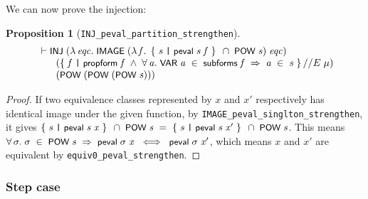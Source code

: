 \documentclass[letterpaper]{article}
\newtheorem{prop}{Proposition}
\renewcommand{\HOLConst}[1]{{\textsf{\upshape\small #1}}}
\renewcommand{\HOLinline}[1]{\ensuremath{#1}}
\newenvironment{holmath}{\begin{displaymath}\begin{array}{l}}{\end{array}\end{displaymath}\ignorespacesafterend}
\begin{document}
We can now prove the injection:
\begin{prop}[\texttt{INJ_peval_partition_strengthen}]
\begin{holmath}
  \ensuremath{\HOLTokenTurnstile}\HOLConst{INJ}\;(\HOLTokenLambda{}\HOLBoundVar{eqc}.\;\HOLConst{IMAGE}\;(\HOLTokenLambda{}\HOLBoundVar{f}.\;\HOLTokenLeftbrace{}\HOLBoundVar{s}\;\HOLTokenBar{}\;\HOLConst{peval}\;\HOLBoundVar{s}\;\HOLBoundVar{f}\HOLTokenRightbrace{}\;\HOLSymConst{\HOLTokenInter{}}\;\HOLConst{POW}\;\HOLFreeVar{s})\;\HOLBoundVar{eqc})\\
\;\;\;\;\;\;\;(\HOLTokenLeftbrace{}\HOLBoundVar{f}\;\HOLTokenBar{}\;\HOLConst{propform}\;\HOLBoundVar{f}\;\HOLSymConst{\HOLTokenConj{}}\;\HOLSymConst{\HOLTokenForall{}}\HOLBoundVar{a}.\;\HOLConst{VAR}\;\HOLBoundVar{a}\;\HOLSymConst{\HOLTokenIn{}}\;\HOLConst{subforms}\;\HOLBoundVar{f}\;\HOLSymConst{\HOLTokenImp{}}\;\HOLBoundVar{a}\;\HOLSymConst{\HOLTokenIn{}}\;\HOLFreeVar{s}\HOLTokenRightbrace{}\HOLSymConst{//E}\;\HOLFreeVar{\ensuremath{\mu}})\\
\;\;\;\;\;\;\;(\HOLConst{POW}\;(\HOLConst{POW}\;(\HOLConst{POW}\;\HOLFreeVar{s})))
\end{holmath}
\end{prop}
\begin{proof} 
If two equivalence classes represented by $x$ and $x'$ respectively has identical image under the given function, by \texttt{IMAGE_peval_singlton_strengthen}, it gives \HOLinline{\HOLTokenLeftbrace{}\HOLBoundVar{s}\;\HOLTokenBar{}\;\HOLConst{peval}\;\HOLBoundVar{s}\;\HOLFreeVar{x}\HOLTokenRightbrace{}\;\HOLSymConst{\HOLTokenInter{}}\;\HOLConst{POW}\;\HOLFreeVar{s}\;\HOLSymConst{=}\;\HOLTokenLeftbrace{}\HOLBoundVar{s}\;\HOLTokenBar{}\;\HOLConst{peval}\;\HOLBoundVar{s}\;\HOLFreeVar{x\sp{\prime}}\HOLTokenRightbrace{}\;\HOLSymConst{\HOLTokenInter{}}\;\HOLConst{POW}\;\HOLFreeVar{s}}. This means \HOLinline{\HOLSymConst{\HOLTokenForall{}}\HOLBoundVar{\ensuremath{\sigma}}.\;\HOLBoundVar{\ensuremath{\sigma}}\;\HOLSymConst{\HOLTokenIn{}}\;\HOLConst{POW}\;\HOLFreeVar{s}\;\HOLSymConst{\HOLTokenImp{}}\;\HOLConst{peval}\;\HOLBoundVar{\ensuremath{\sigma}}\;\HOLFreeVar{x}\;\HOLSymConst{\HOLTokenEquiv{}}\;\HOLConst{peval}\;\HOLBoundVar{\ensuremath{\sigma}}\;\HOLFreeVar{x\sp{\prime}}}, which means $x$ and $x'$ are equivalent by \texttt{equiv0_peval_strengthen}.
\end{proof}


\subsubsection{Step case}
\end{document}
